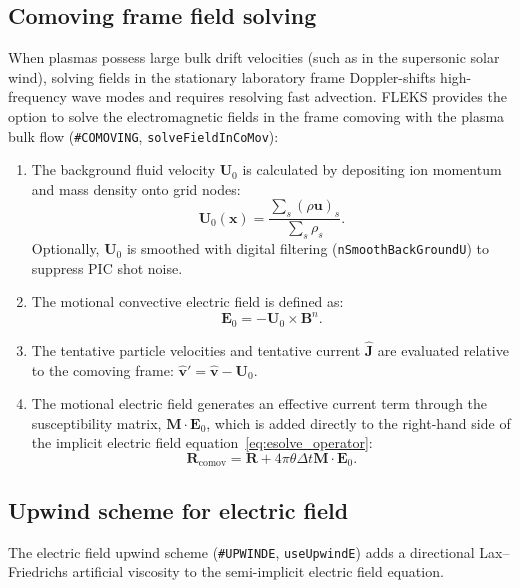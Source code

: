 \documentclass[a4paper, 11pt]{article}
\begin{document}
\subsection{Comoving frame field solving}

When plasmas possess large bulk drift velocities (such as in the supersonic solar wind), solving fields in the stationary laboratory frame Doppler-shifts high-frequency wave modes and requires resolving fast advection. FLEKS provides the option to solve the electromagnetic fields in the frame comoving with the plasma bulk flow (\texttt{\#COMOVING}, \texttt{solveFieldInCoMov}):

\begin{enumerate}
  \item The background fluid velocity $\mathbf{U}_0$ is calculated by depositing ion momentum and mass density onto grid nodes:
  \begin{equation}
  \mathbf{U}_0(\mathbf{x}) = \frac{\sum_s (\rho \mathbf{u})_s}{\sum_s \rho_s}.
  \end{equation}
  Optionally, $\mathbf{U}_0$ is smoothed with digital filtering (\texttt{nSmoothBackGroundU}) to suppress PIC shot noise.
  \item The motional convective electric field is defined as:
  \begin{equation}
  \mathbf{E}_0 = -\mathbf{U}_0 \times \mathbf{B}^n.
  \end{equation}
  \item The tentative particle velocities and tentative current $\hat{\mathbf{J}}$ are evaluated relative to the comoving frame: $\hat{\mathbf{v}}' = \hat{\mathbf{v}} - \mathbf{U}_0$.
  \item The motional electric field generates an effective current term through the susceptibility matrix, $\mathbf{M} \cdot \mathbf{E}_0$, which is added directly to the right-hand side of the implicit electric field equation~\eqref{eq:esolve_operator}:
  \begin{equation}
  \mathbf{R}_{\text{comov}} = \mathbf{R} + 4\pi \theta \Delta t \mathbf{M} \cdot \mathbf{E}_0.
  \end{equation}
\end{enumerate}

\subsection{Upwind scheme for electric field}

The electric field upwind scheme (\texttt{\#UPWINDE}, \texttt{useUpwindE}) adds a directional Lax--Friedrichs artificial viscosity to the semi-implicit electric field equation.
\end{document}
